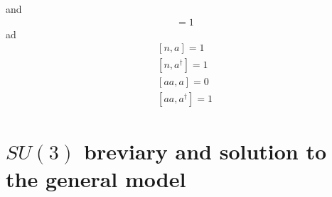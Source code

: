 \documentclass[9pt,twocolumn,twoside]{osajnl}
\begin{document}
and
\begin{eqnarray}
	[a^{\dagger}, a] = 1	
\end{eqnarray}
ad
\begin{eqnarray}
	{}[n, a] = 1 \\
	{}[n, a^{\dagger}] = 1 \\
	{}[aa, a] = 0 \\
	{}[aa, a^{\dagger}] = 1 
\end{eqnarray}




\section{$SU(3)$ breviary and solution to the general model}
\end{document}
